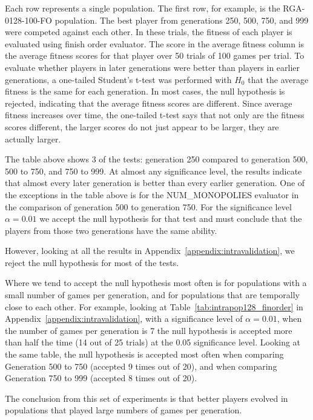 Each row represents a single population. The first row, for example, is the
RGA-0128-100-FO population. The best player from generations 250, 500, 750, and
999 were competed against each other. In these trials, the fitness of each
player is evaluated using finish order evaluator. The score in the average
fitness column is the average fitness scores for that player over 50 trials of
100 games per trial. To evaluate whether players in later generations were
better than players in earlier generations, a one-tailed Student's t-test was
performed with $H_{0}$ that the average fitness is the same for each generation.
In most cases, the null hypothesis is rejected, indicating that the average
fitness scores are different. Since average fitness increases over time, the
one-tailed t-test says that not only are the fitness scores different, the
larger scores do not just appear to be larger, they are actually larger.

The table above shows 3 of the tests: generation 250 compared to generation 500,
500 to 750, and 750 to 999. At almost any significance level, the results
indicate that almost every later generation is better than every earlier
generation. One of the exceptions in the table above is for the NUM\_MONOPOLIES
evaluator in the comparison of generation 500 to generation 750. For the
significance level \(\alpha=0.01\) we accept the null hypothesis for that
test and must conclude that the players from those two generations have the same
ability.

However, looking at all the results in Appendix~\ref{appendix:intravalidation},
we reject the null hypothesis for most of the tests.

Where we tend to accept the null hypothesis most often is for populations with a
small number of games per generation, and for populations that are temporally
close to each other. For example, looking at
Table~\ref{tab:intrapop128_finorder} in Appendix~\ref{appendix:intravalidation},
with a significance level of \(\alpha=0.01\), when the number of games per
generation is 7 the null hypothesis is accepted more than half the time (14 out
of 25 trials) at the 0.05 significance level. Looking at the same table, the
null hypothesis is accepted most often when comparing Generation 500 to 750
(accepted 9 times out of 20), and when comparing Generation 750 to 999 (accepted
8 times out of 20).

The conclusion from this set of experiments is that better players evolved in
populations that played large numbers of games per generation.

